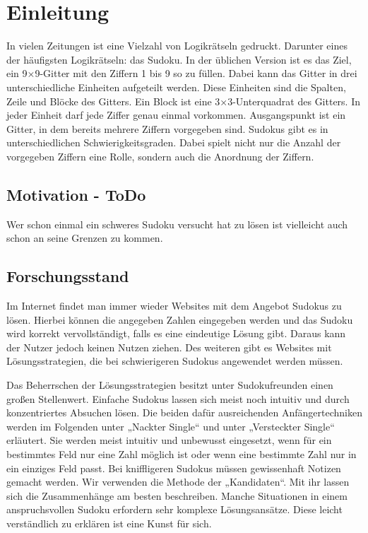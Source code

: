 
\chapter{Einleitung}

In vielen Zeitungen ist eine Vielzahl von Logikrätseln gedruckt. Darunter eines der häufigsten Logikrätseln: das Sudoku. 
In der üblichen Version ist es das Ziel, ein 9×9-Gitter mit den Ziffern 1 bis 9 so zu füllen. Dabei kann das Gitter in drei unterschiedliche Einheiten aufgeteilt werden. Diese Einheiten sind die Spalten, Zeile und Blöcke des Gitters. Ein Block ist eine 3×3-Unterquadrat des Gitters. In jeder Einheit darf jede Ziffer genau einmal vorkommen. 
Ausgangspunkt ist ein Gitter, in dem bereits mehrere Ziffern vorgegeben sind. Sudokus gibt es in unterschiedlichen Schwierigkeitsgraden. Dabei spielt nicht nur die Anzahl der vorgegeben Ziffern eine Rolle, sondern auch die Anordnung der Ziffern.

 

\section{Motivation - ToDo}

Wer schon einmal ein schweres Sudoku versucht hat zu lösen ist vielleicht auch schon an seine Grenzen zu kommen. 



\section{Forschungsstand}

Im Internet findet man immer wieder Websites mit dem Angebot Sudokus zu lösen. Hierbei können die angegeben Zahlen eingegeben werden und das Sudoku wird korrekt vervollständigt, falls es eine eindeutige Lösung gibt. Daraus kann der Nutzer jedoch keinen Nutzen ziehen. Des weiteren gibt es Websites mit Lösungsstrategien, die bei schwierigeren Sudokus angewendet werden müssen. 

Das Beherrschen der Lösungsstrategien besitzt unter Sudokufreunden einen großen Stellenwert. Einfache Sudokus lassen sich meist noch intuitiv und durch konzentriertes Absuchen lösen. Die beiden dafür ausreichenden Anfängertechniken werden im Folgenden unter „Nackter Single“ und unter „Versteckter Single“ erläutert. Sie werden meist intuitiv und unbewusst eingesetzt, wenn für ein bestimmtes Feld nur eine Zahl möglich ist oder wenn eine bestimmte Zahl nur in ein einziges Feld passt. Bei kniffligeren Sudokus müssen gewissenhaft Notizen gemacht werden. Wir verwenden die Methode der „Kandidaten“. Mit ihr lassen sich die Zusammenhänge am besten beschreiben. Manche Situationen in einem anspruchsvollen Sudoku erfordern sehr komplexe Lösungsansätze. Diese leicht verständlich zu erklären ist eine Kunst für sich.



